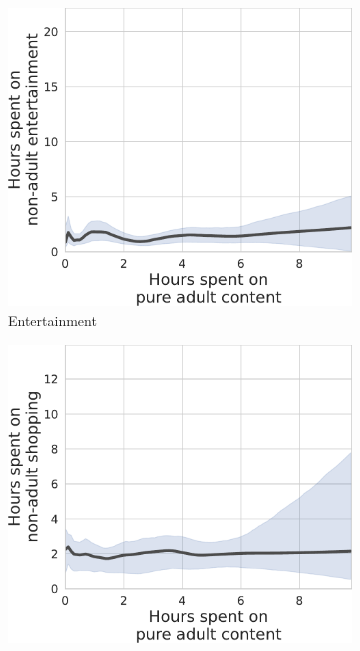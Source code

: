 \documentclass[12pt,twoside]{article}
\begin{document}
\begin{figure}[!h]
\label{fig:tu_prop_entertainment-prop_pure_adult}
     \centering
     \begin{subfigure}[b]{0.495\textwidth}
         \centering
         \includegraphics[width=\textwidth]{figs/tu_duration_entertainment-duration_pure_adult.pdf}
         \caption{Entertainment}
     \end{subfigure}
     \hfill
     \begin{subfigure}[b]{0.495\textwidth}
         \centering
         \includegraphics[width=\textwidth]{figs/tu_duration_shop-duration_pure_adult.pdf}

\end{subfigure}
\end{figure}
\end{document}

